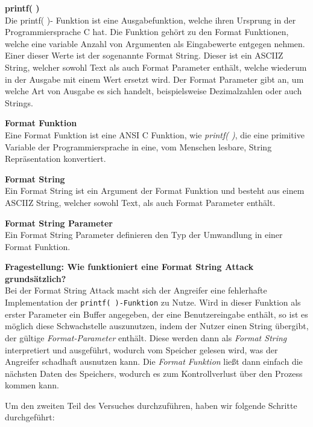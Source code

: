 \documentclass[12pt,a4paper]{article}
\begin{document}
	\textbf{printf( )} \\
	Die printf( )- Funktion ist eine Ausgabefunktion, welche ihren Ursprung in der Programmiersprache C hat. Die Funktion gehört zu den Format Funktionen, welche  eine variable Anzahl von Argumenten als Eingabewerte entgegen nehmen. Einer dieser Werte ist der sogenannte Format String. Dieser ist ein ASCIIZ String, welcher sowohl Text als auch Format Parameter enthält, welche wiederum in der Ausgabe mit einem Wert ersetzt wird. Der Format Parameter gibt an, um welche Art von Ausgabe es sich handelt, beispielsweise Dezimalzahlen oder auch Strings.
	\bigskip
	
	\textbf{Format Funktion} \\
	Eine Format Funktion ist eine ANSI C Funktion, wie \textit{printf( )}, die eine primitive Variable der Programmiersprache in eine, vom Menschen lesbare, String Repräsentation konvertiert.
	\bigskip
	
	\textbf{Format String} \\
	Ein Format String ist ein Argument der Format Funktion und besteht aus einem ASCIIZ String, welcher sowohl Text, als auch Format Parameter enthält.
	\bigskip
	
	\textbf{Format String Parameter} \\
	Ein Format String Parameter definieren den Typ der Umwandlung in einer Format Funktion.
	\bigskip
	
	\textbf{Fragestellung: Wie funktioniert eine Format String Attack grundsätzlich?} \\
	Bei der Format String Attack macht sich der Angreifer eine fehlerhafte Implementation der \texttt{printf( )-Funktion} zu Nutze. Wird in dieser Funktion als erster Parameter ein Buffer angegeben, der eine Benutzereingabe enthält, so ist es möglich diese Schwachstelle auszunutzen, indem der Nutzer einen String übergibt, der gültige \textit{Format-Parameter} enthält. Diese werden dann als \textit{Format String} interpretiert und ausgeführt, wodurch vom Speicher gelesen wird, was der Angreifer schadhaft ausnutzen kann. Die \textit{Format Funktion} ließt dann einfach die nächsten Daten des Speichers, wodurch es zum Kontrollverlust über den Prozess kommen kann.
	\bigskip
	
	Um den zweiten Teil des Versuches durchzuführen, haben wir folgende Schritte durchgeführt:
	
\end{document}
